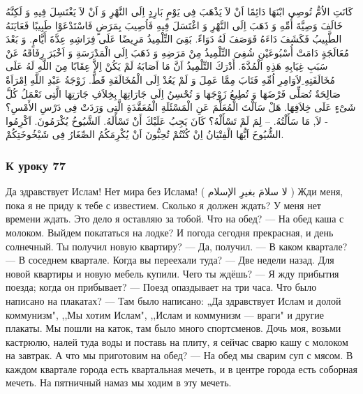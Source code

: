 \documentclass[a5paper]{article}
\begin{document}
كَانَتِ الاُمُّ تُوصِى ابْنَهَا دَائِمًا اَنْ لاَ يَذْهَبَ فِى يَوْمٍ بَارِدٍ اِلَى النَّهْرِ وَ اَنْ لاَ يَغْتَسِلَ فِيهِ وَ لَكِنَّهُ خَالَفَ وَصِيَّةَ أُمِّهِ وَ ذَهَبَ اِلَى النَّهْرِ وَ اغْتَسَلَ فِيهِ فَاُصِيبَ بِمَرَضٍ فَاسْتَدْعَوْا طَبِيبًا فَعَايَنَهُ الطَّبِيبُ فَكَشَفَ دَاءَهُ فَوَصَفَ لَهُ دَوَاءً. بَقِىَ التِّلْمِيذُ مَرِيضًا عَلَى فِرَاشِهِ عِدَّةَ أَيَّامٍ. وَ بَعْدَ مُعَالَجَةٍ دَامَتْ أُسْبُوعَيْنِ شُفِىَ التِّلْمِيذُ مِنْ مَرَضِهِ وَ ذَهَبَ اِلَى الْمَدْرَسَةِ وَ اَخْبَرَ رِفَاقَهُ عَنْ سَبَبِ غِيَابِهِ هَذِهِ الْمُدَّةَ. أَدْرَكَ التِّلْمِيذُ اَنَّ مَا اَصَابَهُ لَمْ يَكُنْ اِلاَّ عِقَابًا مِنَ اللَّهِ لَهُ عَلَى مُخَالَفَتِهِ ِلاَوَامِرِ اُمِّهِ فَتَابَ مِمَّا عَمِلَ وَ لَمْ يَعُدْ اِلَى الْمُخَالَفَةِ قَطُّ. زَوْجَةُ عَبْدِ اللَّهِ اِمْرَاَةٌ صَالِحَةٌ تُصَلِّى فَرْضَهَا وَ تُطِيعُ زَوْجَهَا وَ تُحْسِنُ اِلَى جَارَاتِهَا بِخِلاَفِ جَارَتِهَا الَّتِى تَعْمَلُ كُلَّ شَىْءٍ عَلَى خِلاَفِهَا. هَلْ سَاَلْتَ الْمُعَلِّمَ عَنِ الْمَسْئَلَةِ الْمُعَقَّدَةِ الَّتِى وَرَدَتْ فِى دَرْسِ الأَمْسِ؟ - لاَ, مَا سَأَلْتُهُ. – لِمَ لَمْ تَسْأَلْهُ؟ كَانَ يَجِبُ عَلَيْكَ أَنْ تَسْأَلَهُ. اَلشَّيُوخُ يُكْرَمُونَ. اَكْرِمُوا الشُّيُوخَ اَيُّهَا الْفِتْيَانُ اِنْ كُنْتُمْ تُحِبُّونَ اَنْ يُكْرِمَكُمُ الصِّغَارُ فِى شَيْخُوخَتِكُمْ.

\subsubsection{К уроку 77}
Да здравствует Ислам! Нет мира без Ислама! ( لا سلامَ بغيرِ الإسلام ) Жди меня, пока я не приду к тебе с известием. Сколько я должен ждать? У меня нет времени ждать. Это дело я оставляю за тобой. Что на обед? — На обед каша с молоком. Выйдем покататься на лодке? И погода сегодня прекрасная, и день солнечный. Ты получил новую квартиру? — Да, получил. — В каком квартале? — В соседнем квартале. Когда вы переехали туда? — Две недели назад. Для новой квартиры и новую мебель купили. Чего ты ждёшь? — Я жду прибытия поезда; когда он прибывает? — Поезд опаздывает на три часа. Что было написано на плакатах? — Там было написано: „Да здравствует Ислам и долой коммунизм", ,,Мы хотим Ислам", ,,Ислам и комму­низм — враги" и другие плакаты. Мы пошли на каток, там было много спортсменов. Дочь моя, возьми кастрюлю, налей туда воды и поставь на плиту, я сейчас сварю кашу с молоком на завтрак. А что мы приготовим на обед? — На обед мы сварим суп с мясом. В каждом квартале города есть квартальная мечеть, и в центре города есть соборная мечеть. На пятничный намаз мы ходим в эту мечеть.
\end{document}
